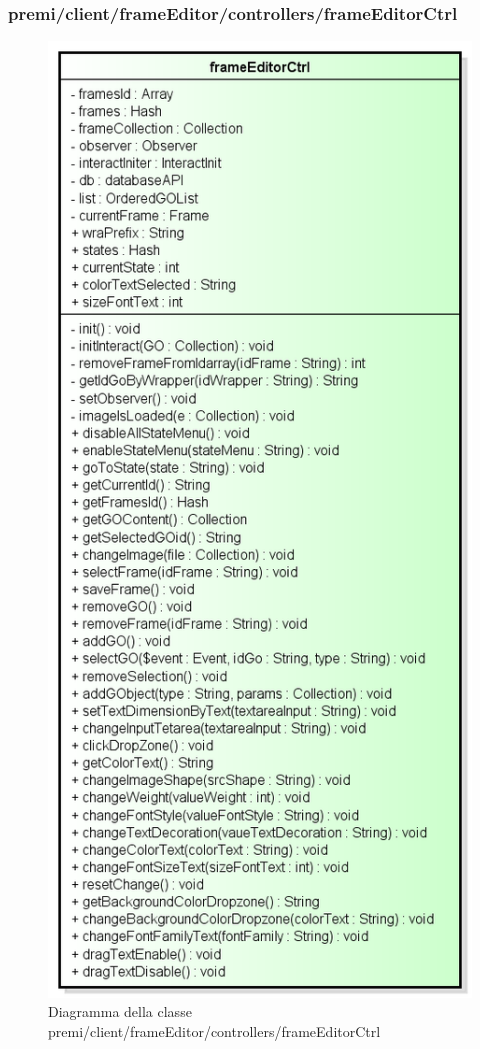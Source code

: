 \subsubsection{premi/client/frameEditor/controllers/frameEditorCtrl}
\begin{figure}[h]
\begin{center}
\includegraphics[scale=0.47]{img/diacla/frameEditorCtrl.png}
\caption{Diagramma della classe premi/client/frameEditor/controllers/frameEditorCtrl}
\end{center}
\end{figure}


